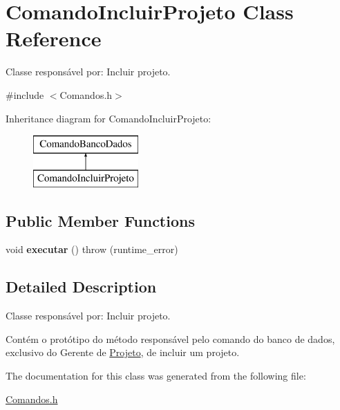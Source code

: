 \hypertarget{class_comando_incluir_projeto}{}\section{Comando\+Incluir\+Projeto Class Reference}
\label{class_comando_incluir_projeto}


Classe responsável por\+: Incluir projeto.  




{\ttfamily \#include $<$Comandos.\+h$>$}

Inheritance diagram for Comando\+Incluir\+Projeto\+:\begin{figure}[H]
\begin{center}
\leavevmode
\includegraphics[height=2.000000cm]{class_comando_incluir_projeto}
\end{center}
\end{figure}
\subsection*{Public Member Functions}
\begin{DoxyCompactItemize}
\item 
\hypertarget{class_comando_incluir_projeto_a8b8b634d46f47ec8f0bfc0b3a2d0f519}{}\label{class_comando_incluir_projeto_a8b8b634d46f47ec8f0bfc0b3a2d0f519} 
void {\bfseries executar} ()  throw (runtime\+\_\+error)
\end{DoxyCompactItemize}


\subsection{Detailed Description}
Classe responsável por\+: Incluir projeto. 

Contém o protótipo do método responsável pelo comando do banco de dados, exclusivo do Gerente de \hyperlink{class_projeto}{Projeto}, de incluir um projeto. 

The documentation for this class was generated from the following file\+:\begin{DoxyCompactItemize}
\item 
\hyperlink{_comandos_8h}{Comandos.\+h}\end{DoxyCompactItemize}
